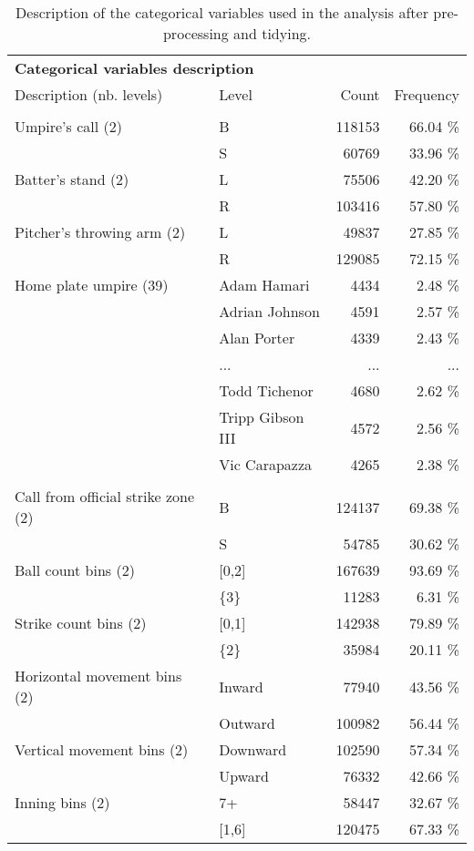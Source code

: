 \begin{table}
\centering\small
\caption{Description of the categorical variables used in the analysis after pre-processing and tidying.}
\label{tab:data.desc.cat}
\begin{tabular}{llrr}
\toprule
\multicolumn{2}{l}{\textbf{Categorical variables description}}\\\addlinespace

                Description (nb. levels) & Level &   Count & Frequency           \\
\midrule
\addlinespace
\multicolumn{4}{c}{\textbf{Original variables}}\\
\addlinespace

Umpire's call (2) & B &  118153 &   66.04 \% \\
                & S &   60769 &   33.96 \% \\
Batter's stand (2) & L &   75506 &   42.20 \% \\
                & R &  103416 &   57.80 \% \\
Pitcher's throwing arm (2) & L &   49837 &   27.85 \% \\
                & R &  129085 &   72.15 \% \\
Home plate umpire (39) & Adam Hamari &    4434 &    2.48 \% \\
                & Adrian Johnson &    4591 &    2.57 \% \\
                & Alan Porter &    4339 &    2.43 \% \\
                & ... &     ... &       ... \\
                & Todd Tichenor &    4680 &    2.62 \% \\
                & Tripp Gibson III &    4572 &    2.56 \% \\
                & Vic Carapazza &    4265 &    2.38 \% \\
\addlinespace
\multicolumn{4}{c}{\textbf{Calculated variables}}\\
\addlinespace

Call from official strike zone (2) & B &  124137 &   69.38 \% \\
                & S &   54785 &   30.62 \% \\
Ball count bins (2) & [0,2] &  167639 &   93.69 \% \\
                & \{3\} &   11283 &    6.31 \% \\
Strike count bins (2) & [0,1] &  142938 &   79.89 \% \\
                & \{2\} &   35984 &   20.11 \% \\
Horizontal movement bins (2) & Inward &   77940 &   43.56 \% \\
                & Outward &  100982 &   56.44 \% \\
Vertical movement bins (2) & Downward &  102590 &   57.34 \% \\
                & Upward &   76332 &   42.66 \% \\
Inning bins (2) & 7+ &   58447 &   32.67 \% \\
                & [1,6] &  120475 &   67.33 \% \\
\bottomrule
\end{tabular}
\end{table}
